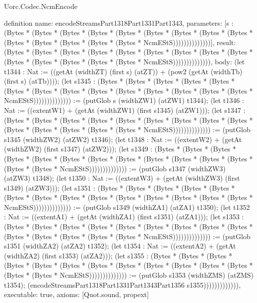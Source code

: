 \begin{lexlean}{Uorc.Codec.NcmEncode}
\begin{semanticmodule}
definition{
  name: encodeStreamsPart1318Part1331Part1343,
  parameters: [s : (Bytes * (Bytes * (Bytes * (Bytes * (Bytes * (Bytes * (Bytes * (Bytes * (Bytes * (Bytes * (Bytes * (Bytes * (Bytes * (Bytes * NcmEStS))))))))))))))],
  result: (Bytes * (Bytes * (Bytes * (Bytes * (Bytes * (Bytes * (Bytes * (Bytes * (Bytes * (Bytes * (Bytes * (Bytes * (Bytes * (Bytes * NcmEStS)))))))))))))),
  body: (let t1344 : Nat := ((getAt (widthZT) (first s) (atZT)) + (pow2 (getAt (widthTb) (first s) (atTb)))); (let s1345 : (Bytes * (Bytes * (Bytes * (Bytes * (Bytes * (Bytes * (Bytes * (Bytes * (Bytes * (Bytes * (Bytes * (Bytes * (Bytes * (Bytes * NcmEStS)))))))))))))) := (putGlob s (widthZW1) (atZW1) t1344); (let t1346 : Nat := ((extentW1) + (getAt (widthZW1) (first s1345) (atZW1))); (let s1347 : (Bytes * (Bytes * (Bytes * (Bytes * (Bytes * (Bytes * (Bytes * (Bytes * (Bytes * (Bytes * (Bytes * (Bytes * (Bytes * (Bytes * NcmEStS)))))))))))))) := (putGlob s1345 (widthZW2) (atZW2) t1346); (let t1348 : Nat := ((extentW2) + (getAt (widthZW2) (first s1347) (atZW2))); (let s1349 : (Bytes * (Bytes * (Bytes * (Bytes * (Bytes * (Bytes * (Bytes * (Bytes * (Bytes * (Bytes * (Bytes * (Bytes * (Bytes * (Bytes * NcmEStS)))))))))))))) := (putGlob s1347 (widthZW3) (atZW3) t1348); (let t1350 : Nat := ((extentW3) + (getAt (widthZW3) (first s1349) (atZW3))); (let s1351 : (Bytes * (Bytes * (Bytes * (Bytes * (Bytes * (Bytes * (Bytes * (Bytes * (Bytes * (Bytes * (Bytes * (Bytes * (Bytes * (Bytes * NcmEStS)))))))))))))) := (putGlob s1349 (widthZA1) (atZA1) t1350); (let t1352 : Nat := ((extentA1) + (getAt (widthZA1) (first s1351) (atZA1))); (let s1353 : (Bytes * (Bytes * (Bytes * (Bytes * (Bytes * (Bytes * (Bytes * (Bytes * (Bytes * (Bytes * (Bytes * (Bytes * (Bytes * (Bytes * NcmEStS)))))))))))))) := (putGlob s1351 (widthZA2) (atZA2) t1352); (let t1354 : Nat := ((extentA2) + (getAt (widthZA2) (first s1353) (atZA2))); (let s1355 : (Bytes * (Bytes * (Bytes * (Bytes * (Bytes * (Bytes * (Bytes * (Bytes * (Bytes * (Bytes * (Bytes * (Bytes * (Bytes * (Bytes * NcmEStS)))))))))))))) := (putGlob s1353 (widthZMS) (atZMS) t1354); (encodeStreamsPart1318Part1331Part1343Part1356 s1355))))))))))))),
  executable: true,
  axioms: [Quot.sound, propext]
}


\end{semanticmodule}
\end{lexlean}

